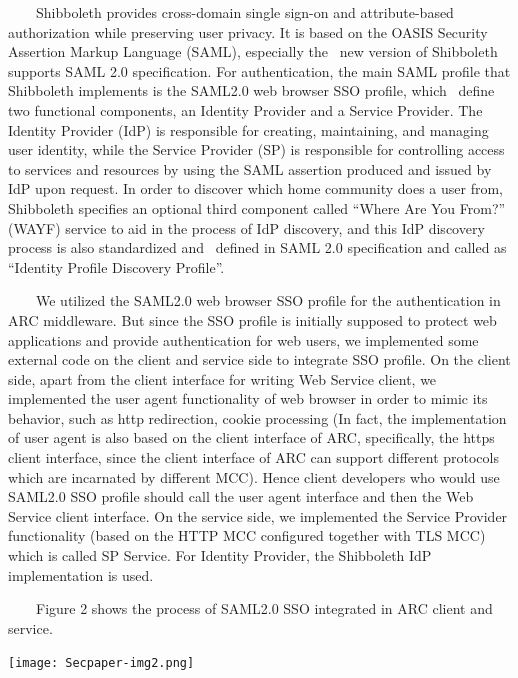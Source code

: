 \documentclass{article}
\begin{document}
\ \ \ \ Shibboleth provides cross-domain single sign-on and
attribute-based authorization while preserving user privacy. It is
based on the OASIS Security Assertion Markup Language (SAML),
especially the \ new version of Shibboleth supports SAML 2.0
specification. For authentication, the main SAML profile that
Shibboleth implements is the SAML2.0 web browser SSO profile, which
\ define two functional components, an Identity Provider and a Service
Provider. The Identity Provider (IdP) is responsible for creating,
maintaining, and managing user identity, while the Service Provider
(SP) is responsible for controlling access to services and resources by
using the SAML assertion produced and issued by IdP upon request. In
order to discover which home community does a user from, Shibboleth
specifies an optional third component called {\textquotedblleft}Where
Are You From?{\textquotedblright} (WAYF) service to aid in the process
of IdP discovery, and this IdP discovery process is also standardized
and \ defined in SAML 2.0 specification and called as
{\textquotedblleft}Identity Profile Discovery
Profile{\textquotedblright}.

\ \ \ \ We utilized the SAML2.0 web browser SSO profile for the
authentication in ARC middleware. But since the SSO profile is
initially supposed to protect web applications and provide
authentication for web users, we implemented some external code on the
client and service side to integrate SSO profile. On the client side,
apart from the client interface for writing Web Service client, we
implemented the user agent functionality of web browser in order to
mimic its behavior, such as http redirection, cookie processing (In
fact, the implementation of user agent is also based on the client
interface of ARC, specifically, the https client interface, since the
client interface of ARC can support different protocols which are
incarnated by different MCC). Hence client developers who would use
SAML2.0 SSO profile should call the user agent interface and then the
Web Service client interface. On the service side, we implemented the
Service Provider functionality (based on the HTTP MCC configured
together with TLS MCC) which is called SP Service. For Identity
Provider, the Shibboleth IdP implementation is used.

\ \ \ \ Figure 2 shows the process of SAML2.0 SSO integrated in ARC
client and service.



\begin{center}
\texttt{[image: Secpaper-img2.png]}
\end{center}
\end{document}
